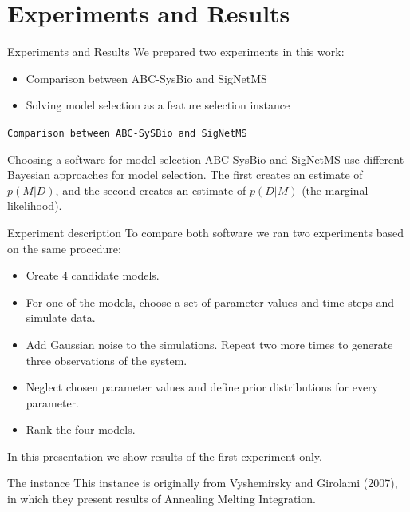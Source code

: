 \documentclass{beamer}
\begin{document}
\section{Experiments and Results}
\begin{frame}{Experiments and Results}
We prepared two experiments in this work: \pause
    \begin{itemize}
        \item{Comparison between ABC-SysBio and SigNetMS}
        \item{Solving model selection as a feature selection instance}
    \end{itemize}
\end{frame}

\begin{frame}{}
\begin{center}
    \texttt{Comparison between ABC-SySBio and SigNetMS}
\end{center}
\end{frame}

\begin{frame}{Choosing a software for model selection}
ABC-SysBio and SigNetMS use different Bayesian approaches for model
selection. \pause The first creates an estimate of $p(M|D)$, \pause and
the second creates an estimate of $p(D|M)$ (the marginal likelihood).
\end{frame}

\begin{frame}{Experiment description}
To compare both software we ran two experiments based on the same 
procedure:
\begin{itemize}
    \pause
    \item{Create 4 candidate models.}
    \pause
    \item{For one of the models, choose a set of parameter values 
        and time steps and simulate data.}
    \pause
    \item{Add Gaussian noise to the simulations. Repeat two more 
        times to generate three observations of the system.}
    \pause
    \item{Neglect chosen parameter values and define prior distributions
        for every parameter.}
    \pause
    \item{Rank the four models.}
\end{itemize}
\pause In this presentation we show results of the first experiment
only.
\end{frame}

\begin{frame}{The instance}
This instance is originally from Vyshemirsky and Girolami (2007), in 
which they present results of Annealing Melting Integration. 
\end{frame}
\end{document}

